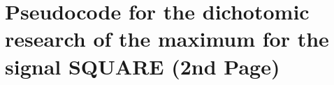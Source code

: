 \documentclass[11pt,a4paper]{article}
\begin{document}
\section{Pseudocode for the dichotomic research of the maximum for the signal SQUARE (2nd Page) }
%
\end{document}
